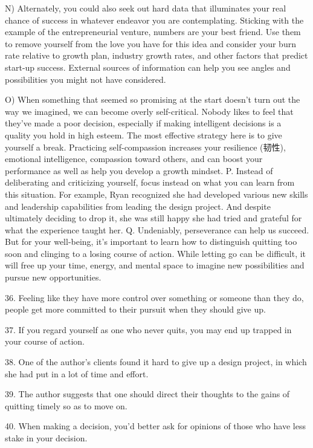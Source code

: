 \documentclass[UTF8,11pt]{ctexart}
\begin{document}
N) Alternately, you could also seek out hard data that illuminates your real chance of success in whatever endeavor you are contemplating. Sticking with the example of the entrepreneurial venture, numbers are your best friend. Use them to remove yourself from the love you have for this idea and consider your burn rate relative to growth plan, industry growth rates, and other factors that predict start-up success. External sources of information can help you see angles and possibilities you might not have considered.


O) When something that seemed so promising at the start doesn’t turn out the way we imagined, we can become overly self-critical. Nobody likes to feel that they’ve made a poor decision, especially if making intelligent decisions is a quality you hold in high esteem. The most effective strategy here is to give yourself a break. Practicing self-compassion increases your resilience (韧性), emotional intelligence, compassion toward others, and can boost your performance as well as help you develop a growth mindset. P. Instead of deliberating and criticizing yourself, focus instead on what you can learn from this situation. For example, Ryan recognized she had developed various new skills and leadership capabilities from leading the design project. And despite ultimately deciding to drop it, she was still happy she had tried and grateful for what the experience taught her. Q. Undeniably, perseverance can help us succeed. But for your well-being, it’s important to learn how to distinguish quitting too soon and clinging to a losing course of action. While letting go can be difficult, it will free up your time, energy, and mental space to imagine new possibilities and pursue new opportunities.


36. Feeling like they have more control over something or someone than they do, people get more committed to their pursuit when they should give up.


37. If you regard yourself as one who never quits, you may end up trapped in your course of action.


38. One of the author’s clients found it hard to give up a design project, in which she had put in a lot of time and effort.


39. The author suggests that one should direct their thoughts to the gains of quitting timely so as to move on.


40. When making a decision, you’d better ask for opinions of those who have less stake in your decision.
\end{document}
